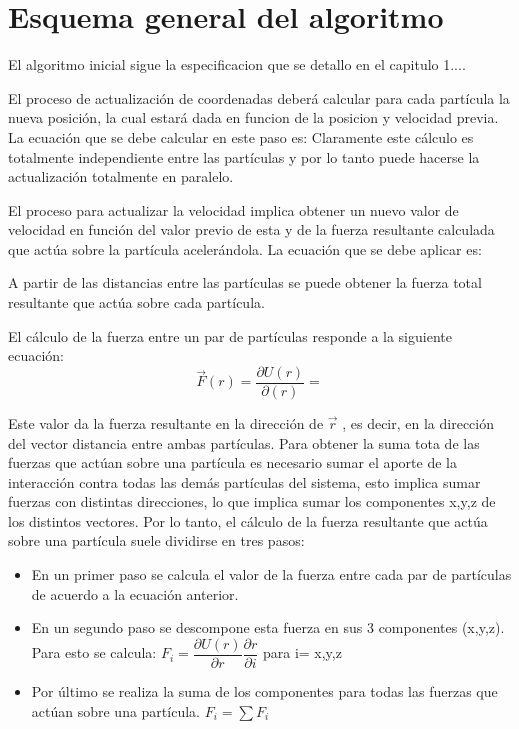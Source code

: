 \section{Esquema general del algoritmo}



El algoritmo inicial sigue la especificacion que se detallo en el capitulo 1....

El proceso de actualización de coordenadas deberá calcular para cada partícula la nueva posición, la cual estará dada en funcion de la posicion y velocidad previa. La ecuación que se debe calcular en este paso es:
Claramente este cálculo es totalmente independiente entre las partículas y por lo tanto puede hacerse la actualización totalmente en paralelo.

El proceso para actualizar la velocidad implica obtener un nuevo valor de velocidad en función del valor previo de esta y de la fuerza resultante calculada que actúa sobre la partícula acelerándola. La ecuación que se debe aplicar es:

A partir de las distancias entre las partículas se puede obtener la fuerza total resultante que actúa sobre cada partícula.

El cálculo de la fuerza entre un par de partículas responde a la siguiente ecuación: \[\vec{F}(r)=\dfrac{\partial U(r)}{ \partial(r)}=\]

Este valor da la fuerza resultante en la dirección de $\vec{r}$ , es decir, en la dirección del vector distancia entre ambas partículas. 
Para obtener la suma tota de las fuerzas que actúan sobre una partícula es necesario sumar el aporte de la interacción contra todas las demás partículas del sistema, esto implica sumar fuerzas con distintas direcciones, lo que implica sumar los componentes x,y,z de los distintos vectores. Por lo tanto, el cálculo de la fuerza resultante que actúa sobre una partícula suele dividirse en tres pasos:

\begin{itemize}
\item En un primer paso se calcula el valor de la fuerza entre cada par de partículas de acuerdo a la ecuación anterior.
\item En un segundo paso se descompone esta fuerza en sus 3 componentes (x,y,z). Para esto se calcula: $F_i=\dfrac{\partial U(r)}{\partial r} \dfrac{\partial r}{\partial i}$  para i= x,y,z

\item Por último se realiza la suma de los componentes para todas las fuerzas que actúan sobre una partícula. $F_i=\sum F_i$
\end{itemize}


